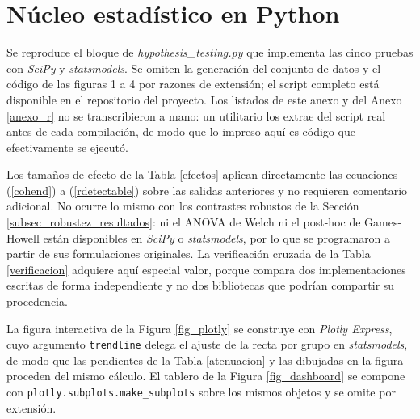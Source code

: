 \section{Núcleo estadístico en Python}
    \label{anexo_python}
    Se reproduce el bloque de \textit{hypothesis\_testing.py} que implementa las
    cinco pruebas con \textit{SciPy} y \textit{statsmodels}. Se omiten la generación
    del conjunto de datos y el código de las figuras 1 a 4 por razones de extensión;
    el script completo está disponible en el repositorio del proyecto. Los listados
    de este anexo y del Anexo \ref{anexo_r} no se transcribieron a mano: un
    utilitario los extrae del script real antes de cada compilación, de modo que
    lo impreso aquí es código que efectivamente se ejecutó.

    \vspace{10pt}

    

    \vspace{10pt}

    Los tamaños de efecto de la Tabla \ref{efectos} aplican directamente las
    ecuaciones (\ref{cohend}) a (\ref{rdetectable}) sobre las salidas anteriores y
    no requieren comentario adicional. No ocurre lo mismo con los contrastes
    robustos de la Sección \ref{subsec_robustez_resultados}: ni el ANOVA de Welch ni
    el post-hoc de Games-Howell están disponibles en \textit{SciPy} o
    \textit{statsmodels}, por lo que se programaron a partir de sus formulaciones
    originales. La verificación cruzada de la Tabla \ref{verificacion} adquiere aquí
    especial valor, porque compara dos implementaciones escritas de forma
    independiente y no dos bibliotecas que podrían compartir su procedencia.

    \vspace{10pt}

    

    \vspace{10pt}

    La figura interactiva de la Figura \ref{fig_plotly} se construye con
    \textit{Plotly Express}, cuyo argumento \texttt{trendline} delega el ajuste de
    la recta por grupo en \textit{statsmodels}, de modo que las pendientes de la
    Tabla \ref{atenuacion} y las dibujadas en la figura proceden del mismo cálculo.
    El tablero de la Figura \ref{fig_dashboard} se compone con
    \texttt{plotly.subplots.make\_subplots} sobre los mismos objetos y se omite por
    extensión.

    \vspace{10pt}

    
